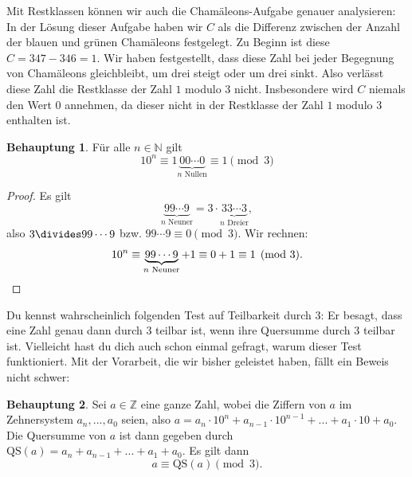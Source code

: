 \documentclass[a4paper,ngerman,12pt]{scrartcl}
\newcommand{\N}{\mathbb{N}}
\newcommand{\Z}{\mathbb{Z}}
\theoremstyle{definition}
\newtheorem{defn}{Definition}
\newtheorem{satz}{Behauptung}
\newtheorem*{bsp}{Beispiel}
\begin{document}
\vspace{10pt}


Mit Restklassen können wir auch die Chamäleons-Aufgabe genauer analysieren: In der Lösung dieser Aufgabe haben wir $C$ als die Differenz zwischen der Anzahl der blauen und grünen Chamäleons festgelegt. Zu Beginn ist diese $C = 347 - 346 = 1$. Wir haben festgestellt, dass diese Zahl bei jeder Begegnung von Chamäleons gleichbleibt, um drei steigt oder um drei sinkt. Also verlässt diese Zahl die Restklasse der Zahl $1$ modulo $3$ nicht. Insbesondere wird $C$ niemals den Wert $0$ annehmen, da dieser nicht in der Restklasse der Zahl $1$ modulo $3$ enthalten ist.

\begin{satz}
  Für alle $n \in \N$ gilt
  \[ 10^n \equiv 1\underbrace{00\cdots0}_{n \text{ Nullen}} \equiv 1 \pmod{3} \]
\end{satz}

\begin{proof}
  Es gilt
  \[ \underbrace{99 \cdots 9}_{n \text{ Neuner}} = 3 \cdot \underbrace{33 \cdots 3}_{n \text{ Dreier}}, \]
  also $3 \divides 99 \cdots 9$ bzw. $99 \cdots 9 \equiv 0 \pmod{3}$. Wir rechnen:
  \[ 10^n \equiv \underbrace{99 \cdots 9}_{n \text{ Neuner}} + 1 \equiv 0 + 1 \equiv 1 \pmod{3}.\qedhere \]
\end{proof}

Du kennst wahrscheinlich folgenden Test auf Teilbarkeit durch $3$: Er besagt, dass eine Zahl genau dann durch $3$ teilbar ist, wenn ihre Quersumme durch $3$ teilbar ist. Vielleicht hast du dich auch schon einmal gefragt, warum dieser Test funktioniert. Mit der Vorarbeit, die wir bisher geleistet haben, fällt ein Beweis nicht schwer:

\begin{satz}
  Sei $a \in \Z$ eine ganze Zahl, wobei die Ziffern von $a$ im Zehnersystem $a_n, ..., a_0$ seien, also $a = a_n \cdot 10^n + a_{n-1} \cdot 10^{n-1} + ... + a_1 \cdot 10 + a_0$. Die Quersumme von $a$ ist dann gegeben durch $\mathrm{QS}(a) = a_n + a_{n-1} + ... + a_1 + a_0$. Es gilt dann
  \[ a \equiv \mathrm{QS}(a) \pmod{3}. \]
\end{satz}
\end{document}
